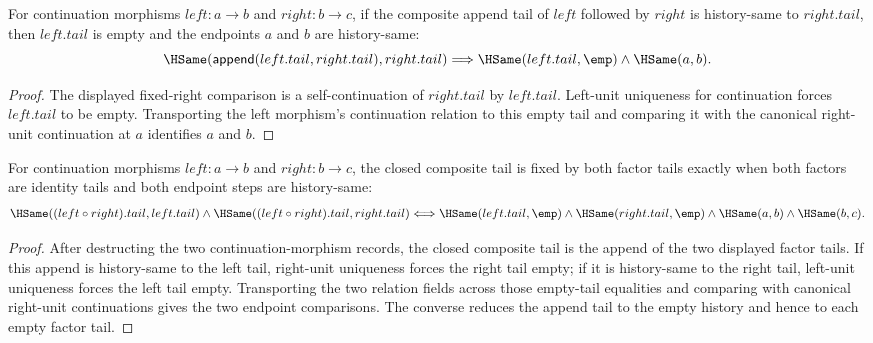 \begin{theorem}
\label{thm:continuation-morphism-comp-right-tail-fixed-left-identity}
For continuation morphisms $left:a\to b$ and $right:b\to c$, if the composite
append tail of $left$ followed by $right$ is history-same to $right.tail$, then
$left.tail$ is empty and the endpoints $a$ and $b$ are history-same:
$$
\HSame(\mathsf{append}(left.tail,right.tail),right.tail)
\Longrightarrow
\HSame(left.tail,\emp)\wedge\HSame(a,b).
$$
\end{theorem}
\begin{proof}
The displayed fixed-right comparison is a self-continuation of $right.tail$ by
$left.tail$. Left-unit uniqueness for continuation forces $left.tail$ to be
empty. Transporting the left morphism's continuation relation to this empty
tail and comparing it with the canonical right-unit continuation at $a$
identifies $a$ and $b$.
\end{proof}

\begin{theorem}
\label{thm:continuation-morphism-composite-tail-fixed-both-identity}
For continuation morphisms $left:a\to b$ and $right:b\to c$, the closed
composite tail is fixed by both factor tails exactly when both factors are
identity tails and both endpoint steps are history-same:
$$
\HSame((left\circ right).tail,left.tail)\wedge
\HSame((left\circ right).tail,right.tail)
\Longleftrightarrow
\HSame(left.tail,\emp)\wedge\HSame(right.tail,\emp)\wedge
\HSame(a,b)\wedge\HSame(b,c).
$$
\end{theorem}
\begin{proof}
After destructing the two continuation-morphism records, the closed composite
tail is the append of the two displayed factor tails. If this append is
history-same to the left tail, right-unit uniqueness forces the right tail
empty; if it is history-same to the right tail, left-unit uniqueness forces the
left tail empty. Transporting the two relation fields across those empty-tail
equalities and comparing with canonical right-unit continuations gives the two
endpoint comparisons. The converse reduces the append tail to the empty
history and hence to each empty factor tail.
\end{proof}


